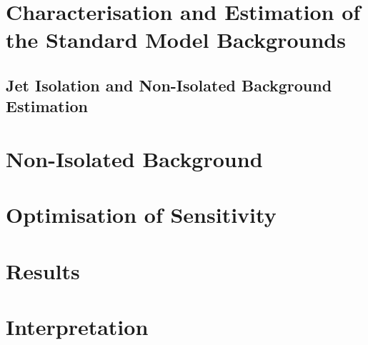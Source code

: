 \section{Characterisation and Estimation of the Standard Model Backgrounds}

\subsection{Jet Isolation and Non-Isolated Background Estimation}
\label{jetty-background-estimation}

\section{Non-Isolated Background}

\section{Optimisation of Sensitivity}

\section{Results}

\section{Interpretation}
